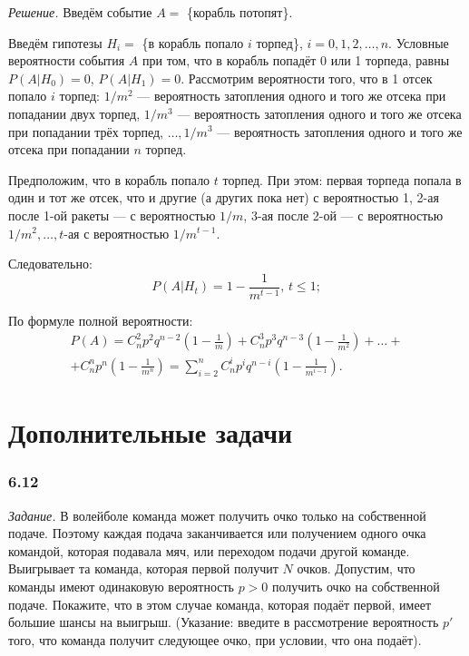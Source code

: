 \textit{Решение.} Введём событие $A =$ \{корабль потопят\}.

Введём гипотезы $H_i =$ \{в корабль попало $i$ торпед\}, $i = 0, 1, 2, \dotsc, n$.
Условные вероятности события $A$ при том, что в корабль попадёт 0 или 1 торпеда,
равны $P \left( \left. A \right| H_0 \right) = 0, \, P \left( \left. A \right| H_1 \right) = 0$.
Рассмотрим вероятности того, что в 1 отсек попало $i$ торпед: $1/m^2$ ---
вероятность затопления одного и того же отсека при попадании двух торпед,
$1/m^3$ ---
вероятность затопления одного и того же отсека при попадании трёх торпед,
$ \dotsc, 1/m^3$ --- вероятность затопления одного и того же отсека при попадании $n$ торпед.

Предположим, что в корабль попало $t$ торпед.
При этом: первая торпеда попала в один и тот же отсек, что и другие (а других пока нет) с вероятностью 1, 2-ая после 1-ой ракеты --- с вероятностью $1/m$, 3-ая после 2-ой --- с вероятностью $1/m^2, \dotsc, t$-ая с вероятностью $1/m^{t-1}$.

Следовательно:
$$P \left( \left. A \right| H_t \right) =
1 - \frac{1}{m^{t-1}}, \, t \leq 1;$$

По формуле полной вероятности:
\begin{equation*}
\begin{split}
P \left( A \right) =
C_n^2 p^2 q^{n-2} \left( 1 - \frac{1}{m} \right) +
C_n^3 p^3 q^{n-3} \left( 1 - \frac{1}{m^2} \right) + \dotsc + \\
+ C_n^n p^n \left( 1 - \frac{1}{m^n} \right) =
\sum \limits_{i=2}^n C_n^i p^i q^{n-i} \left( 1 - \frac{1}{m^{i-1}} \right).
\end{split}
\end{equation*}

\section*{Дополнительные задачи}

\subsubsection*{6.12}

\textit{Задание.} В волейболе команда может получить очко только на собственной подаче.
Поэтому каждая подача заканчивается или получением одного очка командой, которая подавала мяч, или переходом подачи другой команде.
Выигрывает та команда, которая первой получит $N$ очков.
Допустим, что команды имеют одинаковую вероятность $p > 0$ получить очко на собственной подаче.
Покажите, что в этом случае команда, которая подаёт первой, имеет большие шансы на выигрыш.
(Указание: введите в рассмотрение вероятность $p'$ того, что команда получит следующее очко, при условии, что она подаёт).

